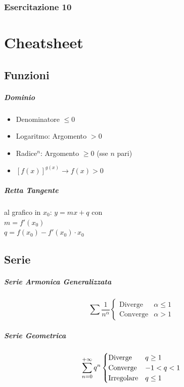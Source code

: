 \documentclass[12pt, a4paper, openany]{book}
\begin{document}
\subsection{Esercitazione 10}

\chapter{Cheatsheet}
\section*{Funzioni}
\paragraph*{Dominio}
\begin{itemize}
	\item Denominatore $\leq 0$
	\item Logaritmo: Argomento $>0$
	\item Radice$^n$: Argomento $\geq 0$ (sse $n$ pari)
	\item $[f(x)]^{g(x)} \to f(x)>0$
\end{itemize}

\paragraph*{Retta Tangente} al grafico in $x_0$: $y=mx + q$ con
\\$m= f'(x_0)$
\\$q=f(x_0)-f'(x_0)\cdot x_0$


\section*{Serie}
\paragraph*{Serie Armonica Generalizzata}
\begin{equation*}
	\sum \frac{1}{n^\alpha} \begin{cases}
		\text{Diverge}  & \alpha\leq 1 \\
		\text{Converge} & \alpha> 1
	\end{cases}
\end{equation*}
\paragraph*{Serie Geometrica}
\begin{equation*}
	\sum_{n=0}^{+\infty} q^n \begin{cases}
		\text{Diverge}    & q\geq 1 \\
		\text{Converge}   & -1<q<1  \\
		\text{Irregolare} & q\leq 1
	\end{cases}
\end{equation*}
\end{document}
